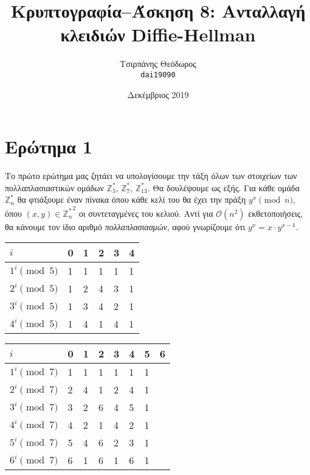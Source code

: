 \documentclass{article}
\title{Κρυπτογραφία--Άσκηση 8: Ανταλλαγή κλειδιών Diffie-Hellman}
\author{Τσιρπάνης Θεόδωρος\\ \texttt{dai19090}}
\date{Δεκέμβριος 2019}
\begin{document}

\maketitle

\section*{Ερώτημα 1}

Το πρώτο ερώτημα μας ζητάει να υπολογίσουμε την τάξη όλων των στοιχείων των πολλαπλασιαστικών ομάδων $\mathbb{Z}_5^*$, $\mathbb{Z}_7^*$, $\mathbb{Z}_{13}^*$. Θα δουλέψουμε ως εξής. Για κάθε ομάδα $\mathbb{Z}_n^*$ θα φτιάξουμε έναν πίνακα όπου κάθε κελί του θα έχει την πράξη $y^x \pmod n$, όπου $(x, y) \in {\mathbb{Z}_n^*}^2$ οι συντεταγμένες του κελιού. Αντί για $\mathcal{O}(n^2)$ εκθετοποιήσεις, θα κάνουμε τον ίδιο αριθμό \emph{πολλαπλασιασμών}, αφού γνωρίζουμε ότι $y^x = x \cdot y^{x - 1}$.

\begin{longtable}[c]{l|l|l|l|l|l}
    $i$ & 0 & 1 & 2 & 3 & 4 \\ \hline
    ${1}^i \pmod 5$ & 1 & 1 & 1 & 1 & 1 \\ \hline
    ${2}^i \pmod 5$ & 1 & 2 & 4 & 3 & 1 \\ \hline
    ${3}^i \pmod 5$ & 1 & 3 & 4 & 2 & 1 \\ \hline
    ${4}^i \pmod 5$ & 1 & 4 & 1 & 4 & 1 \\
\end{longtable}

\begin{longtable}[c]{l|l|l|l|l|l|l|l}
    $i$ & 0 & 1 & 2 & 3 & 4 & 5 & 6 \\ \hline
    ${1}^i \pmod 7$ & 1 & 1 & 1 & 1 & 1 & 1 \\ \hline
    ${2}^i \pmod 7$ & 2 & 4 & 1 & 2 & 4 & 1 \\ \hline
    ${3}^i \pmod 7$ & 3 & 2 & 6 & 4 & 5 & 1 \\ \hline
    ${4}^i \pmod 7$ & 4 & 2 & 1 & 4 & 2 & 1 \\ \hline
    ${5}^i \pmod 7$ & 5 & 4 & 6 & 2 & 3 & 1 \\ \hline
    ${6}^i \pmod 7$ & 6 & 1 & 6 & 1 & 6 & 1 \\
\end{longtable}
\end{document}
